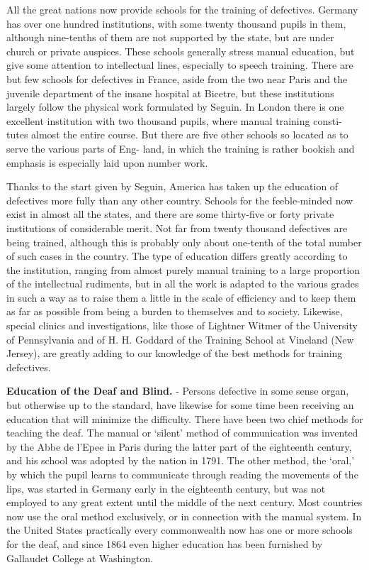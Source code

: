 \documentclass[
]{book}
\begin{document}
All the great nations now provide schools for the training of defectives. Germany has over one hundred institutions, with some twenty thousand pupils in them, although nine-tenths of them are not supported by the state, but are under church or private auspices. These schools generally stress manual education, but give some attention to intellectual lines, especially to speech training. There are but few schools for defectives in France, aside from the two near Paris and the juvenile department of the insane hospital at Bicetre, but these institutions largely follow the physical work formulated by Seguin. In London there is one excellent institution with two thousand pupils, where manual training consti- tutes almost the entire course. But there are five other schools so located as to serve the various parts of Eng- land, in which the training is rather bookish and emphasis is especially laid upon number work.

Thanks to the start given by Seguin, America has taken up the education of defectives more fully than any other country. Schools for the feeble-minded now exist in almost all the states, and there are some thirty-five or forty private institutions of considerable merit. Not far from twenty thousand defectives are being trained, although this is probably only about one-tenth of the total number of such cases in the country. The type of education differs greatly according to the institution, ranging from almost purely manual training to a large proportion of the intellectual rudiments, but in all the work is adapted to the various grades in such a way as to raise them a little in the scale of efficiency and to keep them as far as possible from being a burden to themselves and to society. Likewise, special clinics and investigations, like those of Lightner Witmer of the University of Pennsylvania and of H. H. Goddard of the Training School at Vineland (New Jersey), are greatly adding to our knowledge of the best methods for training defectives.

\textbf{Education of the Deaf and Blind.} - Persons defective in some sense organ, but otherwise up to the standard, have likewise for some time been receiving an education that will minimize the difficulty. There have been two chief methods for teaching the deaf. The manual or `silent' method of communication was invented by the Abbe de l'Epee in Paris during the latter part of the eighteenth century, and his school was adopted by the nation in 1791. The other method, the `oral,' by which the pupil learns to communicate through reading the movements of the lips, was started in Germany early in the eighteenth century, but was not employed to any great extent until the middle of the next century. Most countries now use the oral method exclusively, or in connection with the manual system. In the United States practically every commonwealth now has one or more schools for the deaf, and since 1864 even higher education has been furnished by Gallaudet College at Washington.
\end{document}
